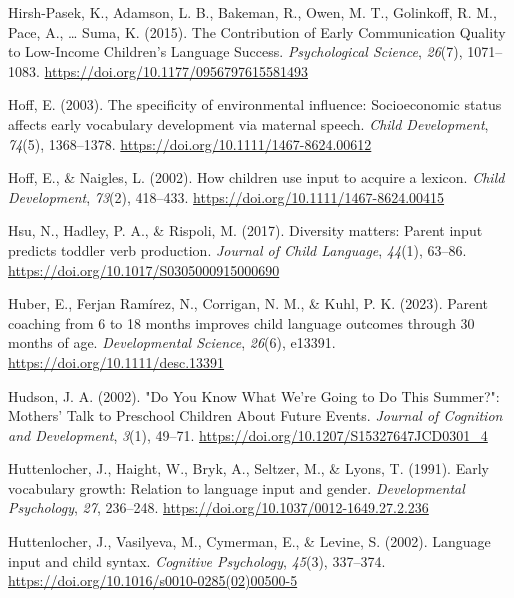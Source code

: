 \documentclass[
  man]{apa6}
\newlength{\cslhangindent}
\newlength{\cslentryspacingunit} %
\newenvironment{CSLReferences}[2] %
 {%
  \setlength{\parindent}{0pt}
  \ifodd #1
  \let\oldpar\par
  \def\par{\hangindent=\cslhangindent\oldpar}
  \fi
  \setlength{\parskip}{#2\cslentryspacingunit}
 }%
 {}
\begin{document}
\begin{CSLReferences}{1}{0}
\leavevmode{}%
Hirsh-Pasek, K., Adamson, L. B., Bakeman, R., Owen, M. T., Golinkoff, R. M., Pace, A., \ldots{} Suma, K. (2015). The {Contribution} of {Early Communication Quality} to {Low-Income Children}'s {Language Success}. \emph{Psychological Science}, \emph{26}(7), 1071--1083. \url{https://doi.org/10.1177/0956797615581493}

\leavevmode{}%
Hoff, E. (2003). The specificity of environmental influence: Socioeconomic status affects early vocabulary development via maternal speech. \emph{Child Development}, \emph{74}(5), 1368--1378. \url{https://doi.org/10.1111/1467-8624.00612}

\leavevmode{}%
Hoff, E., \& Naigles, L. (2002). How children use input to acquire a lexicon. \emph{Child Development}, \emph{73}(2), 418--433. \url{https://doi.org/10.1111/1467-8624.00415}

\leavevmode{}%
Hsu, N., Hadley, P. A., \& Rispoli, M. (2017). Diversity matters: Parent input predicts toddler verb production. \emph{Journal of Child Language}, \emph{44}(1), 63--86. \url{https://doi.org/10.1017/S0305000915000690}

\leavevmode{}%
Huber, E., Ferjan Ramírez, N., Corrigan, N. M., \& Kuhl, P. K. (2023). Parent coaching from 6 to 18 months improves child language outcomes through 30 months of age. \emph{Developmental Science}, \emph{26}(6), e13391. \url{https://doi.org/10.1111/desc.13391}

\leavevmode{}%
Hudson, J. A. (2002). "{Do You Know What We}'re {Going} to {Do This Summer}?": {Mothers}' {Talk} to {Preschool Children About Future Events}. \emph{Journal of Cognition and Development}, \emph{3}(1), 49--71. \url{https://doi.org/10.1207/S15327647JCD0301_4}

\leavevmode{}%
Huttenlocher, J., Haight, W., Bryk, A., Seltzer, M., \& Lyons, T. (1991). Early vocabulary growth: {Relation} to language input and gender. \emph{Developmental Psychology}, \emph{27}, 236--248. \url{https://doi.org/10.1037/0012-1649.27.2.236}

\leavevmode{}%
Huttenlocher, J., Vasilyeva, M., Cymerman, E., \& Levine, S. (2002). Language input and child syntax. \emph{Cognitive Psychology}, \emph{45}(3), 337--374. \url{https://doi.org/10.1016/s0010-0285(02)00500-5}


\end{CSLReferences}
\end{document}
